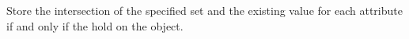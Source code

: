 Store the intersection of the specified set and the existing value for each
attribute if and only if the  hold on the object.



